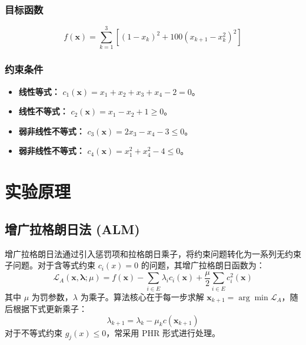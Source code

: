 \documentclass[a4paper,12pt]{article}
\begin{document}
\subsubsection{目标函数}
\begin{equation}
    f(\bm{x}) = \sum_{k=1}^{3} \left[ (1 - x_k)^2 + 100(x_{k+1} - x_k^2)^2 \right]
\end{equation}

\subsubsection{约束条件}
\begin{itemize}
    \item \textbf{线性等式：} $c_1(\bm{x}) = x_1 + x_2 + x_3 + x_4 - 2 = 0$。
    \item \textbf{线性不等式：} $c_2(\bm{x}) = x_1 - x_2 + 1 \ge 0$。
    \item \textbf{弱非线性不等式：} $c_3(\bm{x}) = 2x_3 - x_4 - 3 \le 0$。
    \item \textbf{弱非线性不等式：} $c_4(\bm{x}) = x_1^2 + x_4^2 - 4 \le 0$。
\end{itemize}

\section{实验原理}

\subsection{增广拉格朗日法 (ALM)}
增广拉格朗日法通过引入惩罚项和拉格朗日乘子，将约束问题转化为一系列无约束子问题。对于含等式约束 $c_i(x)=0$ 的问题，其增广拉格朗日函数为：
\begin{equation}
    \mathcal{L}_A(\bm{x}, \bm{\lambda}; \mu) = f(\bm{x}) - \sum_{i \in E} \lambda_i c_i(\bm{x}) + \frac{\mu}{2} \sum_{i \in E} c_i^2(\bm{x})
\end{equation}
其中 $\mu$ 为罚参数，$\lambda$ 为乘子。算法核心在于每一步求解 $\bm{x}_{k+1} = \arg\min \mathcal{L}_A$，随后根据下式更新乘子：
\begin{equation}
    \lambda_{k+1} = \lambda_k - \mu_k c(\bm{x}_{k+1})
\end{equation}
对于不等式约束 $g_j(x) \le 0$，常采用 PHR 形式进行处理。
\end{document}
